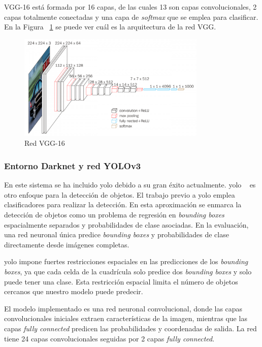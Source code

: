 VGG-16  está formada por 16 capas, de las cuales 13 son capas convolucionales, 2 capas totalmente conectadas y una capa de \textit{softmax} que se emplea para clasificar. En la Figura ~\ref{fig.vgg16} se puede ver cuál es la arquitectura de la red VGG.

 \begin{figure}[H] 
\begin{center}
	\includegraphics[width=0.8\textwidth]{figures/Diseno_global/vgg16.png}
   \caption{Red VGG-16}
	\label{fig.vgg16}
\end{center}
\end{figure}

\subsubsection{Entorno Darknet y red YOLOv3}\label{sub.darknet}

En este sistema se ha incluido \acrfull{yolo} debido a su gran éxito actualmente. \acrshort{yolo} ~\cite{yolo_article1} es otro enfoque para la detección de objetos. El trabajo previo a \acrshort{yolo} emplea clasificadores para realizar la detección. En esta aproximación se enmarca la detección de objetos como un problema de regresión en \textit{bounding boxes} espacialmente separados y probabilidades de clase asociadas. En la evaluación, una red neuronal única predice \textit{bounding boxes} y probabilidades de clase directamente desde imágenes completas. 

\acrshort{yolo} impone fuertes restricciones espaciales en las predicciones de los \textit{bounding boxes}, ya que cada celda de la cuadrícula solo predice dos \textit{bounding boxes} y solo puede tener una clase. Esta restricción espacial limita el número de objetos cercanos que nuestro modelo puede predecir. 

El modelo implementado es una red neuronal convolucional, donde las capas convolucionales iniciales extraen características de la imagen, mientras que las capas \textit{fully connected} predicen las probabilidades y coordenadas de salida. La red tiene 24 capas convolucionales seguidas por 2 capas \textit{fully connected}. 

